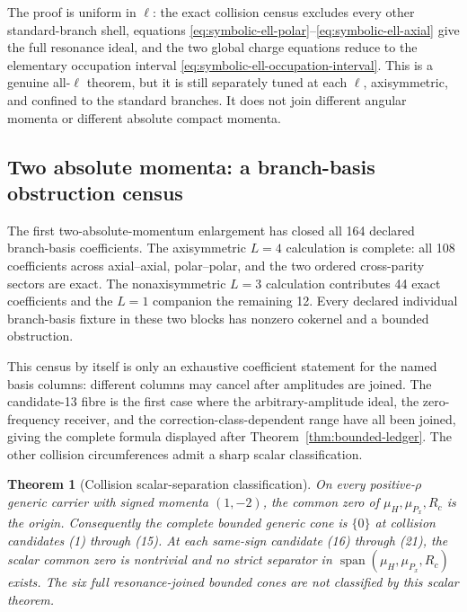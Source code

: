 \documentclass[11pt]{article}
\newtheorem{theorem}{Theorem}[section]
\theoremstyle{definition}
\theoremstyle{remark}
\begin{document}
The proof is uniform in \(\ell\): the exact collision census excludes every
other standard-branch shell, equations
\eqref{eq:symbolic-ell-polar}--\eqref{eq:symbolic-ell-axial} give the full
resonance ideal, and the two global charge equations reduce to the elementary
occupation interval \eqref{eq:symbolic-ell-occupation-interval}.  This is a
genuine all-\(\ell\) theorem, but it is still separately tuned at each
\(\ell\), axisymmetric, and confined to the standard branches.  It does not
join different angular momenta or different absolute compact momenta.

\subsection{Two absolute momenta: a branch-basis obstruction census}

The first two-absolute-momentum enlargement has closed all 164 declared
branch-basis coefficients.  The axisymmetric \(L=4\) calculation is
complete: all 108 coefficients across axial--axial, polar--polar, and the two
ordered cross-parity sectors are exact.  The nonaxisymmetric \(L=3\)
calculation contributes 44 exact coefficients and the \(L=1\) companion the
remaining 12.  Every declared
individual branch-basis fixture in these two blocks has nonzero cokernel and
a bounded obstruction.

This census by itself is only an exhaustive coefficient statement for the
named basis columns: different columns may cancel after amplitudes are joined.
The candidate-13 fibre is the first case where the arbitrary-amplitude ideal,
the zero-frequency receiver, and the correction-class-dependent range have
all been joined, giving the complete formula displayed after
Theorem~\ref{thm:bounded-ledger}.  The other collision circumferences admit a
sharp scalar classification.

\begin{theorem}[Collision scalar-separation classification]
On every positive-\(\rho\) generic carrier with signed momenta \((1,-2)\),
the common zero of \(\mu_H,\mu_{P_x},R_c\) is the origin.  Consequently the
complete bounded generic cone is \(\{0\}\) at collision candidates (1)
through (15).  At each same-sign candidate (16) through (21), the scalar
common zero is nontrivial and no strict separator in
\(\operatorname{span}(\mu_H,\mu_{P_x},R_c)\) exists.  The six full
resonance-joined bounded cones are not classified by this scalar theorem.
\end{theorem}
\end{document}
